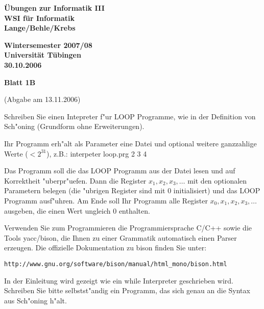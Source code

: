 \documentclass[a4paper]{article}
\def\header#1#2#3{\pagestyle{empty}
\noindent
\begin{minipage}[t]{0.6\textwidth}
\begin{flushleft}
\bf \"Ubungen zur Informatik III\\
WSI f\"ur Informatik\\
Lange/Behle/Krebs
\end{flushleft}
\end{minipage}
\begin{minipage}[t]{0.4\textwidth}
\begin{flushright}
\bf Wintersemester 2007/08\\
Universit\"at T\"ubingen\\
#2 %
\end{flushright}
\end{minipage}

\begin{center}
{\Large\bf Blatt #1}

{(Abgabe am #3)}
\end{center}
}
\begin{document}
\bigskip

\newpage
\header{1B}{30.10.2006}{13.11.2006}

\bigskip


\bigskip

Schreiben Sie einen Intepreter f"ur LOOP Programme, wie in der Definition von Sch"oning (Grundform ohne Erweiterungen).

Ihr Programm erh"alt als Parameter eine Datei und optional weitere ganzzahlige Werte ($<2^{31}$), z.B.:\newline
interpeter loop.prg 2 3 4

Das Programm soll die das LOOP Programm aus der Datei lesen und auf Korrektheit "uberpr"uefen. Dann die Register $x_1,x_2,x_3,\dots$ mit den optionalen Parametern belegen (die "ubrigen Register sind mit 0 initialisiert) und das LOOP Programm ausf"uhren. Am Ende soll Ihr Programm alle Register $x_0,x_1,x_2,x_3,\dots$ ausgeben, die einen Wert ungleich 0 enthalten.

Verwenden Sie zum Programmieren die Programmiersprache C/C++ sowie die Tools yacc/bison, die Ihnen zu einer Grammatik automatisch einen Parser erzeugen. Die offizielle Dokumentation zu bison finden Sie unter:

{\tt http://www.gnu.org/software/bison/manual/html\_mono/bison.html}

In der Einleitung wird gezeigt wie ein while Interpreter geschrieben wird. Schreiben Sie bitte selbstst"andig ein Programm, das sich genau an die Syntax aus Sch"oning h"alt.

\bigskip
\end{document}
